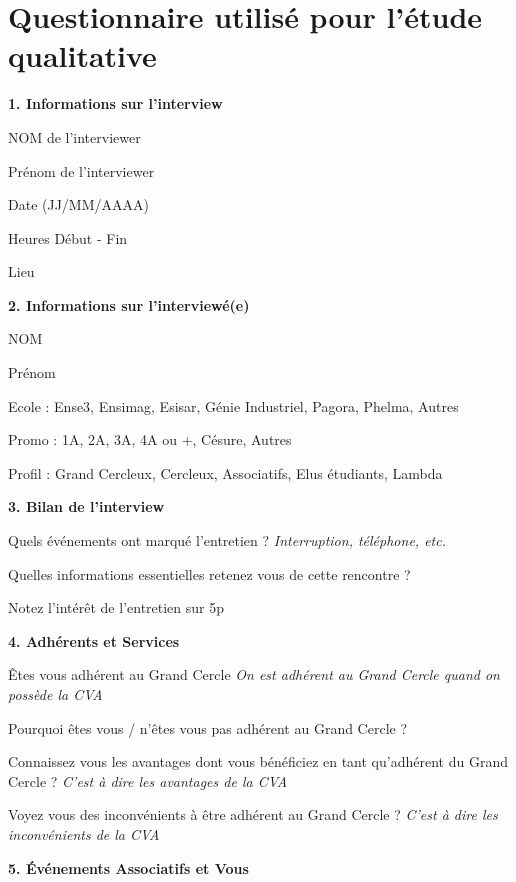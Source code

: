 \documentclass[a4paper, 11px]{article}
\begin{document}
\newpage

\section{Questionnaire utilisé pour l'étude qualitative}

 \textbf {\large 1. Informations sur l'interview}

	NOM de l'interviewer
	
	Prénom de l'interviewer
	
	Date (JJ/MM/AAAA)
	
	Heures Début - Fin
	
	Lieu

\vspace{.3cm}

 \textbf {\large 2. Informations sur l'interviewé(e)}

	NOM
	
	Prénom
	
	Ecole : 
	 Ense3,
	 Ensimag,
	 Esisar,
	 Génie Industriel,
	 Pagora,
	 Phelma,
	 Autres
	
	Promo :
	 1A,
	 2A,
	 3A,
	 4A ou +,
	 Césure,
	 Autres
	
	Profil : 
	 Grand Cercleux,
	 Cercleux,
	 Associatifs,
	 Elus étudiants,
	 Lambda

\vspace{.3cm}

 \textbf {\large 3. Bilan de l'interview}

Quels événements ont marqué l'entretien ?
\textit{Interruption, téléphone, etc.}

Quelles informations essentielles retenez vous de cette rencontre ?

Notez l'intérêt de l'entretien sur 5p


\vspace{.3cm}

 \textbf {\large 4. Adhérents et Services}

Êtes vous adhérent au Grand Cercle
\textit{On est adhérent au Grand Cercle quand on possède la CVA}

Pourquoi êtes vous / n'êtes vous pas adhérent au Grand Cercle ?

Connaissez vous les avantages dont vous bénéficiez en tant qu'adhérent du Grand Cercle ?
\textit{C'est à dire les avantages de la CVA}

Voyez vous des inconvénients à être adhérent au Grand Cercle ?
\textit{C'est à dire les inconvénients de la CVA}


\vspace{.2cm}
 \textbf {\large 5. Événements Associatifs et Vous}
\end{document}
